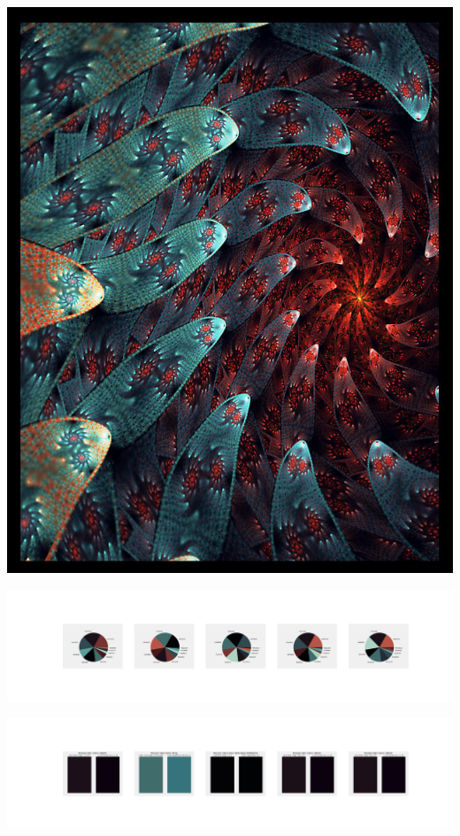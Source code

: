 \documentclass[11pt]{article}
\begin{document}
\begin{landscape}
    \begin{center}
    \includegraphics[width=\textwidth]{./nbimg/file (120).jpg}
    \end{center}

    \begin{center}
    \includegraphics[width=250mm]{./nbimg/pie-24.jpg}
    \end{center}

    \begin{center}
    \includegraphics[width=250mm]{./nbimg/peak-24.jpg}
    \end{center}
    


\end{landscape}
\end{document}
